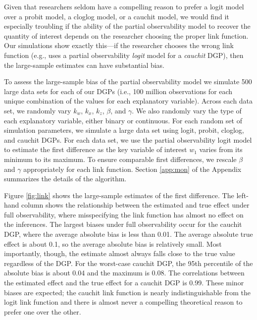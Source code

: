 \documentclass[10pt]{article}
\begin{document}
Given that researchers seldom have a compelling reason to prefer a logit model over a probit model, a cloglog model, or a cauchit model, we would find it especially troubling if the ability of the partial observability model to recover the quantity of interest depends on the researcher choosing the proper link function. 
Our simulations show exactly this---if the researcher chooses the wrong link function (e.g., uses a partial observability \textit{logit} model for a \textit{cauchit} DGP), then the large-sample estimates can have substantial bias.

To assess the large-sample bias of the partial observability model we simulate 500 large data sets for each of our DGPs (i.e., 100 million observations for each unique combination of the values for each explanatory variable). 
Across each data set, we randomly vary $k_w$, $k_x$, $k_z$, $\beta$, and $\gamma$. 
We also randomly vary the type of each explanatory variable, either binary or continuous. 
For each random set of simulation parameters, we simulate a large data set using logit, probit, cloglog, and cauchit DGPs.  
For each data set, we use the partial observability logit model to estimate the first difference as the key variable of interest $w_1$ varies from its minimum to its maximum. 
To ensure comparable first differences, we rescale $\beta$ and $\gamma$ appropriately for each link function. Section \ref{app:mon} of the Appendix summarizes the details of the algorithm.

Figure \ref{fig:link} shows the large-sample estimates of the first difference. 
The left-hand column shows the relationship between the estimated and true effect under full observability, where misspecifying the link function has almost no effect on the inferences. 
The largest biases under full observability occur for the cauchit DGP, where the average absolute bias is less than 0.01. 
The average absolute true effect is about 0.1, so the average absolute bias is relatively small. 
Most importantly, though, the estimate almost always falls close to the true value regardless of the DGP. 
For the worst-case cauchit DGP, the 95th percentile of the absolute bias is about 0.04 and the maximum is 0.08. 
The correlations between the estimated effect and the true effect for a cauchit DGP is 0.99.
These minor biases are expected; the cauchit link function is nearly indistinguishable from the logit link function and there is almost never a compelling theoretical reason to prefer one over the other. 
\end{document}

